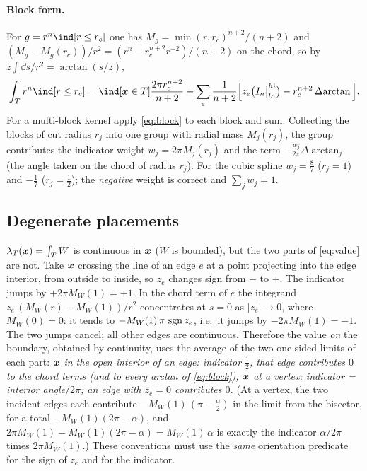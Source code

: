 \paragraph{Block form.} For $g=r^n\ind[r\le r_c]$ one has $M_g=\min(r,r_c)^{n+2}/(n+2)$ and
$(M_g-M_g(r_c))/r^2=(r^n-r_c^{n+2}r^{-2})/(n+2)$ on the chord, so by $z\!\int\!\dd s/r^2=\arctan(s/z)$,
\begin{equation}\label{eq:block}
 \int_T r^n\ind[r\le r_c]=\ind[\xx\in T]\frac{2\pi r_c^{n+2}}{n+2}+\sum_e\frac{1}{n+2}\Big[z_e\big(I_n\big|_{lo}^{hi}\big)-r_c^{n+2}\,\Delta\!\arctan\Big].
\end{equation}
For a multi-block kernel apply \cref{eq:block} to each block and sum. Collecting the blocks of cut radius $r_j$ into one
group with radial mass $M_j(r_j)$, the group contributes the indicator weight $w_j=2\pi M_j(r_j)$ and the term
$-\frac{w_j}{2\pi}\Delta\!\arctan_j$ (the angle taken on the chord of radius $r_j$). For the cubic spline $w_j=\frac87$ ($r_j=1$) and $-\frac17$
($r_j=\frac12$); the \emph{negative} weight is correct and $\sum_jw_j=1$. 

\subsection{Degenerate placements}\label{sec:degenerate}
$\lambda_T(\bm x)=\int_TW$ is continuous in $\bm x$ ($W$ is bounded), but the two parts of \eqref{eq:value} are not.
Take $\bm x$ crossing the line of an edge $e$ at a point projecting into the edge interior, from outside to inside, so $z_e$ changes sign from $-$ to $+$.
The indicator jumps by $+2\pi M_W(1)=+1$. In the chord term of $e$ the integrand $z_e\,(M_W(r)-M_W(1))/r^2$ concentrates at $s=0$ as $|z_e|\to0$,
where $M_W(0)=0$: it tends to $-M_W(1)\,\pi\,\operatorname{sgn} z_e$, i.e.\ it jumps by $-2\pi M_W(1)=-1$. The two jumps cancel; all other edges are continuous.
Therefore the value \emph{on} the boundary, obtained by continuity, uses the average of the two one-sided limits of each part:
\emph{$\bm x$ in the open interior of an edge: indicator $\frac12$, that edge contributes $0$ to the chord terms (and to every arctan of \cref{eq:block});
$\bm x$ at a vertex: indicator = interior angle$/2\pi$; an edge with $z_e=0$ contributes $0$.}
(At a vertex, the two incident edges each contribute $-M_W(1)\,(\pi-\frac\alpha2)$ in the limit from the bisector, for a total $-M_W(1)(2\pi-\alpha)$,
and $2\pi M_W(1)-M_W(1)(2\pi-\alpha)=M_W(1)\,\alpha$ is exactly the indicator $\alpha/2\pi$ times $2\pi M_W(1)$.)
These conventions must use the \emph{same} orientation predicate for the sign of $z_e$ and for the indicator. 

